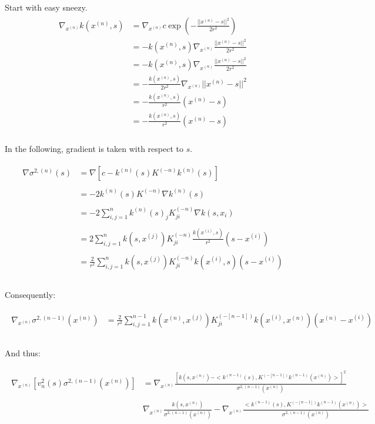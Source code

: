 \documentclass[paper=a4, fontsize=11pt]{scrartcl} %
\numberwithin{equation}{section} %
\numberwithin{figure}{section} %
\numberwithin{table}{section} %
\newcommand{\gxn}{\nabla_{x^{(n)}}} %
\newcommand{\xn}{x^{(n)}}
\newcommand{\xii}{x^{(i)}}
\newcommand{\xj}{x^{(j)}}
\newcommand{\kn}{k^{(n)}}
\newcommand{\knm}{k^{(n-1)}}
\newcommand{\Kinvn}{K^{(-n)}} %
\newcommand{\Kinvnm}{K^{(-[n-1])}}
\newcommand{\sqn}{\sigma ^{2 , (n)}     }
\newcommand{\sqnm}{\sigma ^{2 , (n-1)}     }
\newcommand{\signxn}{\sigma^{2, (n-1)} (\xn)}
\begin{document}
Start with easy sneezy.
\begin{align}
 \begin{split}
  \gxn k(\xn,s) &= \gxn c\exp(-\frac{||\xn - s||^2}{2r^2} )\\
%
&= -k(\xn,s) \gxn\frac{||\xn - s||^2}{2r^2} \\
%
&= -k(\xn,s) \gxn\frac{||\xn - s||^2}{2r^2} \\
%
&= -\frac{k(\xn,s)}{2r^2} \gxn||\xn - s||^2 \\
%
&= -\frac{k(\xn,s)}{r^2} (\xn-s)\\
%
&= -\frac{k(\xn ,s)}{r^2} (\xn-s)\\
 \end{split}
\end{align}

In the following, gradient is taken with respect to $s$.

\begin{align}
 \begin{split}
  \nabla \sqn (s) &= \nabla [ c - \kn(s) \Kinvn \kn(s)]\\\\
%
%
%
&= -2 \kn(s) \Kinvn \nabla\kn(s)\\\\
%
%
%
&= -2 \sum_{i,j=1}^{n} \kn(s)_j \Kinvn_{ji} \nabla k (s, x_i)\\\\
%
%
%
&= 2 \sum_{i,j=1}^{n} k(s,\xj) \Kinvn_{ji} \frac{k(\xii ,s)}{r^2} (s-\xii)\\\\
%
%
%
&= \frac{2}{r^2} \sum_{i,j=1}^{n} k(s,\xj) \Kinvn_{ji} k(\xii ,s) (s-\xii)\\\\
 \end{split}
\end{align}

Consequently:

\begin{align}
 \begin{split}
  \gxn \signxn &= \frac{2}{r^2} \sum_{i,j=1}^{n-1} k(\xn,\xj) \Kinvnm_{ji} k(\xii ,\xn) (\xn-\xii)\\\\
 \end{split}
\end{align}

And thus:

\begin{align}
 \begin{split}
  \gxn \left[ v_n^2(s)\sqnm(\xn) \right] &= \gxn \frac{[k(s, \xn) - < \knm (s) ,  \Kinvnm \knm (\xn) > ]^2}{\signxn}\\\\
%
%
%
&\gxn \frac{ k(s, \xn) }{\signxn} - \gxn \frac {< \knm (s) ,  \Kinvnm \knm (\xn) >}{\signxn} \\\\
%
%
%
 \end{split}
\end{align}
\end{document}
